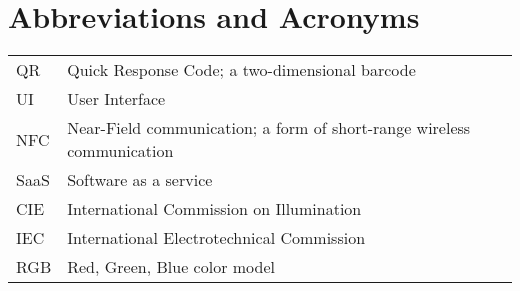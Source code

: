 \documentclass[thesis.tex]{subfiles}
\begin{document}
\chapter*{Abbreviations and Acronyms}

\noindent
\begin{longtable}{@{}p{}p{}@{}}
QR & Quick Response Code; a two-dimensional barcode \\
UI & User Interface \\
NFC & Near-Field communication; a form of short-range wireless communication \\
SaaS & Software as a service \\
CIE & International Commission on Illumination \\
IEC & International Electrotechnical Commission \\
RGB & Red, Green, Blue color model

\end{longtable}
\end{document}
